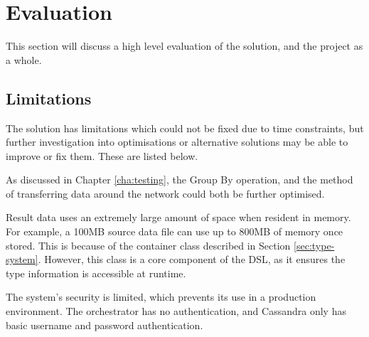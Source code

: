 \chapter{Evaluation}\label{cha:evaluation}
This section will discuss a high level evaluation of the solution, and the project as a whole.

\section{Limitations}
The solution has limitations which could not be fixed due to time constraints, but further investigation into optimisations or alternative solutions may be able to improve or fix them. These are listed below.

As discussed in Chapter \ref{cha:testing}, the Group By operation, and the method of transferring data around the network could both be further optimised.



Result data uses an extremely large amount of space when resident in memory. For example, a 100MB source data file can use up to 800MB of memory once stored. This is because of the container class described in Section \ref{sec:type-system}. However, this class is a core component of the DSL, as it ensures the type information is accessible at runtime.

The system's security is limited, which prevents its use in a production environment. The orchestrator has no authentication, and Cassandra only has basic username and password authentication.

